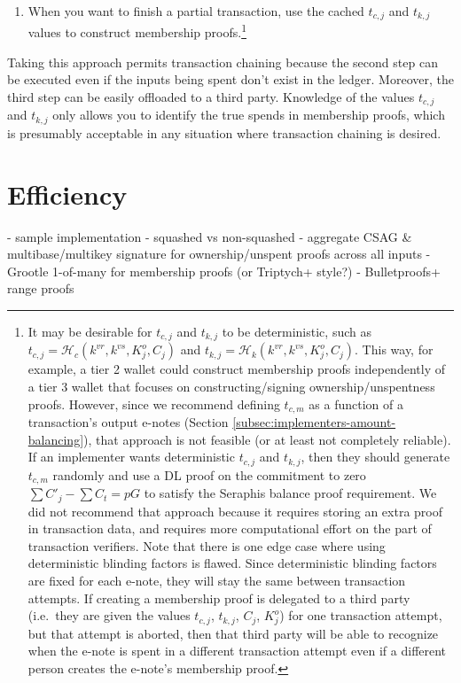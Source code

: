 \begin{itemize}
\begin{enumerate}
        \item When you want to finish a partial transaction, use the cached $t_{c,j}$ and $t_{k,j}$ values to construct membership proofs.\footnote{It may be desirable for $t_{c,j}$ and $t_{k,j}$ to be deterministic, such as $t_{c,j} = \mathcal{H}_c(k^{vr}, k^{vs}, K^o_j, C_j)$ and $t_{k,j} = \mathcal{H}_k(k^{vr}, k^{vs}, K^o_j, C_j)$. This way, for example, a tier 2 wallet could construct membership proofs independently of a tier 3 wallet that focuses on constructing/signing ownership/unspentness proofs. However, since we recommend defining $t_{c,m}$ as a function of a transaction's output e-notes (Section \ref{subsec:implementers-amount-balancing}), that approach is not feasible (or at least not completely reliable). If an implementer wants deterministic $t_{c,j}$ and $t_{k,j}$, then they should generate $t_{c,m}$ randomly and use a DL proof on the commitment to zero $\sum C'_j - \sum C_t = p G$ to satisfy the Seraphis balance proof requirement. We did not recommend that approach because it requires storing an extra proof in transaction data, and requires more computational effort on the part of transaction verifiers. Note that there is one edge case where using deterministic blinding factors is flawed. Since deterministic blinding factors are fixed for each e-note, they will stay the same between transaction attempts. If creating a membership proof is delegated to a third party (i.e.\ they are given the values $t_{c,j}$, $t_{k,j}$, $C_j$, $K^o_j$) for one transaction attempt, but that attempt is aborted, then that third party will be able to recognize when the e-note is spent in a different transaction attempt even if a different person creates the e-note's membership proof.}
    \end{enumerate}

    Taking this approach permits transaction chaining because the second step can be executed even if the inputs being spent don't exist in the ledger. Moreover, the third step can be easily offloaded to a third party. Knowledge of the values $t_{c,j}$ and $t_{k,j}$ only allows you to identify the true spends in membership proofs, which is presumably acceptable in any situation where transaction chaining is desired.
\end{itemize}



\section{Efficiency}
\label{sec:efficiency}

- sample implementation
    - squashed vs non-squashed
    - aggregate CSAG \& multibase/multikey signature for ownership/unspent proofs across all inputs
    - Grootle 1-of-many for membership proofs (or Triptych+ style?)
    - Bulletproofs+ range proofs

